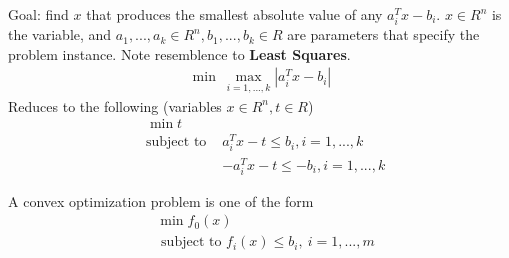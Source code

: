 \documentclass{article}
\begin{document}
\begin{definition}
  Goal: find $x$ that produces the smallest absolute value of any $a_i^Tx-b_i$.
  $x\in R^n$ is the variable, and $a_1,...,a_k\in R^n,b_1,...,b_k\in R$ are
  parameters that specify the problem instance.  Note resemblence to \textbf{Least Squares}.
  \begin{align}
    \min~\max_{i=1,...,k}|a_i^Tx-b_i|
  \end{align}
  \vpush
  Reduces to the following (variables $x\in R^n,t\in R$)
  \begin{align}
     & \min t                                            \\
    \nonumber
     & \text{subject to } & a_i^Tx-t\leq b_i,i=1,...,k   \\
    \nonumber
     & & -a_i^Tx-t\leq -b_i,i=1,...,k
  \end{align}
\end{definition}
\begin{definition}
  A convex optimization problem is one of the form
  \begin{align}
     & \min f_0(x)                                  \\
    \nonumber
     & \text{ subject to }f_i(x)\leq b_i,~i=1,...,m
  \end{align}
\end{definition}
\end{document}
